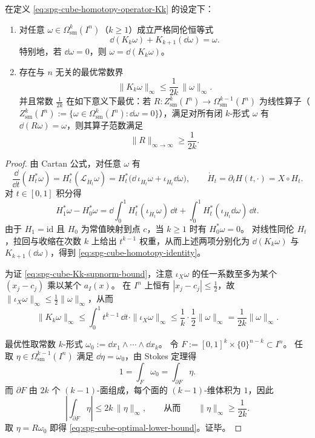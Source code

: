 \begin{theorem}\label{thm:spg-cube-optimal-bounded-poincare-stokes-inverse}
在定义 \eqref{eq:spg-cube-homotopy-operator-Kk} 的设定下：
\begin{enumerate}
  \item 对任意 \(\omega\in\Omega^k_{\mathrm{sm}}(I^n)\)（\(k\ge 1\)）成立严格同伦恒等式
  \begin{equation}\label{eq:spg-cube-homotopy-identity}
  \dd(K_k\omega)+K_{k+1}(\dd\omega)=\omega.
  \end{equation}
  特别地，若 \(\dd\omega=0\)，则 \(\omega=\dd(K_k\omega)\)。
  \item 存在与 \(n\) 无关的最优常数界
  \begin{equation}\label{eq:spg-cube-Kk-supnorm-bound}
  \|K_k\omega\|_\infty\le \frac{1}{2k}\,\|\omega\|_\infty.
  \end{equation}
  并且常数 \(\frac{1}{2k}\) 在如下意义下最优：若 \(R:Z^k_{\mathrm{sm}}(I^n)\to\Omega^{k-1}_{\mathrm{sm}}(I^n)\) 为线性算子（\(Z^k_{\mathrm{sm}}(I^n):=\{\omega\in\Omega^k_{\mathrm{sm}}(I^n):\dd\omega=0\}\)），满足对所有闭 \(k\)-形式 \(\omega\) 有 \(\dd(R\omega)=\omega\)，则其算子范数满足
  \begin{equation}\label{eq:spg-cube-optimal-lower-bound}
  \|R\|_{\infty\to\infty}\ge \frac{1}{2k}.
  \end{equation}
\end{enumerate}
\end{theorem}
\begin{proof}
由 Cartan 公式，对任意 \(\omega\) 有
\[
\frac{\dd}{\dd t}(H_t^*\omega)=H_t^*(\mathcal{L}_{\dot H_t}\omega)
=H_t^*\bigl(\dd\,\iota_{\dot H_t}\omega+\iota_{\dot H_t}\dd\omega\bigr),
\qquad
\dot H_t=\partial_tH(t,\cdot)=X\circ H_t.
\]
对 \(t\in[0,1]\) 积分得
\[
H_1^*\omega-H_0^*\omega
=\dd\int_0^1 H_t^*(\iota_{\dot H_t}\omega)\,\dd t+\int_0^1 H_t^*(\iota_{\dot H_t}\dd\omega)\,\dd t.
\]
由于 \(H_1=\mathrm{id}\) 且 \(H_0\) 为常值映射到点 \(c\)，当 \(k\ge 1\) 时有 \(H_0^*\omega=0\)。
对线性同伦 \(H_t\)，拉回与收缩在次数 \(k\) 上给出 \(t^{k-1}\) 权重，从而上述两项分别化为 \(\dd(K_k\omega)\) 与 \(K_{k+1}(\dd\omega)\)，得到 \eqref{eq:spg-cube-homotopy-identity}。
\par
为证 \eqref{eq:spg-cube-Kk-supnorm-bound}，注意 \(\iota_X\omega\) 的任一系数至多为某个 \((x_j-c_j)\) 乘以某个 \(a_I(x)\)。
在 \(I^n\) 上恒有 \(|x_j-c_j|\le \tfrac12\)，故 \(\|\iota_X\omega\|_\infty\le \tfrac12\|\omega\|_\infty\)，从而
\[
\|K_k\omega\|_\infty
\le \int_0^1 t^{k-1}\,\dd t\cdot \|\iota_X\omega\|_\infty
\le \frac{1}{k}\cdot\frac12\|\omega\|_\infty
=\frac{1}{2k}\|\omega\|_\infty.
\]
\par
最优性取常数 \(k\)-形式 \(\omega_0:=\dd x_1\wedge\cdots\wedge \dd x_k\)。
令 \(F:=[0,1]^k\times\{0\}^{n-k}\subset I^n\)。
任取 \(\eta\in\Omega^{k-1}_{\mathrm{sm}}(I^n)\) 满足 \(\dd\eta=\omega_0\)，由 Stokes 定理得
\[
1=\int_F\omega_0=\int_{\partial F}\eta.
\]
而 \(\partial F\) 由 \(2k\) 个 \((k-1)\)-面组成，每个面的 \((k-1)\)-维体积为 \(1\)，因此
\[
\left|\int_{\partial F}\eta\right|
\le 2k\,\|\eta\|_\infty,
\qquad\text{从而}\qquad
\|\eta\|_\infty\ge \frac{1}{2k}.
\]
取 \(\eta=R\omega_0\) 即得 \eqref{eq:spg-cube-optimal-lower-bound}。证毕。
\end{proof}

